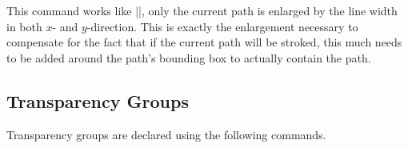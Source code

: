 \begin{command}{\pgfsetfadingforcurrentpathstroked{}}
    This command works like |\pgfsetfadingforcurrentpath|, only the current
    path is enlarged by the line width in both $x$- and $y$-direction. This is
    exactly the enlargement necessary to compensate for the fact that if the
    current path will be stroked, this much needs to be added around the path's
    bounding box to actually contain the path.
\begin{codeexample}[preamble={\pgfdeclarehorizontalshading{shading}{100bp}
{ color(0pt)=(transparent!0);    color(25bp)=(transparent!0);
  color(75bp)=(transparent!100); color(100bp)=(transparent!100)}
%
\pgfdeclarefading{fading}{\pgfuseshading{shading}}}]
\end{codeexample}
\end{command}


\subsection{Transparency Groups}

Transparency groups are declared using the following commands.

